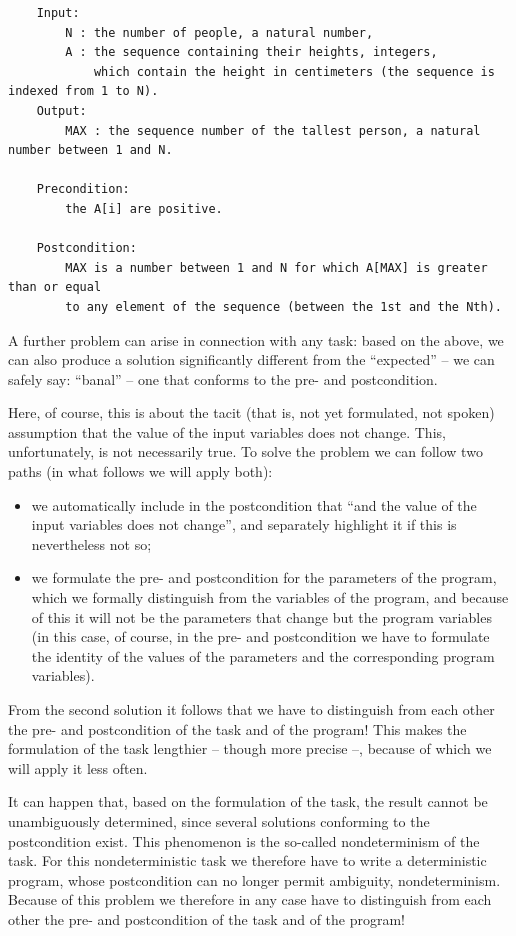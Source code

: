 \documentclass[margin=0px]{article}
\begin{document}
\begin{verbatim}
	Input:
     	N : the number of people, a natural number,
     	A : the sequence containing their heights, integers,
        	which contain the height in centimeters (the sequence is indexed from 1 to N).
	Output:
     	MAX : the sequence number of the tallest person, a natural number between 1 and N.

	Precondition:
    	the A[i] are positive.

	Postcondition:
	    MAX is a number between 1 and N for which A[MAX] is greater than or equal
	    to any element of the sequence (between the 1st and the Nth).
	\end{verbatim}

A further problem can arise in connection with any task: based on the above, we can also produce a solution significantly different from the ``expected'' -- we can safely say: ``banal'' -- one that conforms to the pre- and postcondition.

Here, of course, this is about the tacit (that is, not yet formulated, not spoken) assumption that the value of the input variables does not change. This, unfortunately, is not necessarily true. To solve the problem we can follow two paths (in what follows we will apply both):

\begin{itemize}
    \item	we automatically include in the postcondition that ``and the value of the input variables does not change'', and separately highlight it if this is nevertheless not so;
    \item we formulate the pre- and postcondition for the parameters of the program, which we formally distinguish from the variables of the program, and because of this it will not be the parameters that change but the program variables (in this case, of course, in the pre- and postcondition we have to formulate the identity of the values of the parameters and the corresponding program variables).
\end{itemize}

From the second solution it follows that we have to distinguish from each other the pre- and postcondition of the task and of the program! This makes the formulation of the task lengthier -- though more precise --, because of which we will apply it less often.

It can happen that, based on the formulation of the task, the result cannot be unambiguously determined, since several solutions conforming to the postcondition exist. This phenomenon is the so-called nondeterminism of the task. For this nondeterministic task we therefore have to write a deterministic program, whose postcondition can no longer permit ambiguity, nondeterminism. Because of this problem we therefore in any case have to distinguish from each other the pre- and postcondition of the task and of the program!
\end{document}
